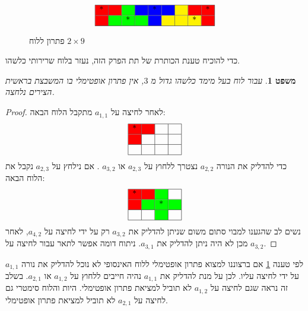 \documentclass[12pt,leqno]{article}
\theoremstyle{theoremdd}
\newtheorem{theorem}{משפט}[section]
\begin{document}
\begin{figure}[ht]
    \caption{פתרון ללוח 
    $2 \times 9$}
    \label{fig: 2x9 have min sol}
    \centering
    \[\begin{array}{|
        p{0.2cm}|p{0.2cm}|p{0.2cm}|
        p{0.2cm}|p{0.2cm}|p{0.2cm}|
        p{0.2cm}|p{0.2cm}|p{0.2cm}|}
        \hline
        \cellcolor{red}*&\cellcolor{red} &\cellcolor{green} &
        \cellcolor{blue}&\cellcolor{blue}* &\cellcolor{blue} &
        \cellcolor{yellow}&\cellcolor{red}&\cellcolor{red}* \\
        \hline
        \cellcolor{red}&\cellcolor{green} &\cellcolor{green}* &
        \cellcolor{green}&\cellcolor{blue} &\cellcolor{yellow} &
        \cellcolor{yellow}&\cellcolor{yellow}* &\cellcolor{red}\\
        \hline
    \end{array}\]
\end{figure}

כדי להוכיח טענת הכותרת של תת הפרק הזה, נעזר בלוח שרירותי כלשהו.
\begin{theorem}
    \label{thm:cant-press-a11}
    עבור לוח בעל מימד כלשהו גדול מ
    $3$,
    אין פתרון 
    אופטימלי בו המשבצת בראשית הצירים נלחצה.
\end{theorem}
\begin{proof}
    לאחר לחיצה על 
    $a_{1,1}$
    מתקבל הלוח הבאה:
    \[\begin{array}{|p{0.2cm}|p{0.2cm}|p{0.2cm}|p{0.2cm}|}
        \hline
        \cellcolor{red} *&\cellcolor{red} & & \\
        \hline
        \cellcolor{red}&  & &  \\
        \hline
         & & &  \\
        \hline
    \end{array}\]
    כדי להדליק 
    את הנורה
    $a_{2,2}$
    נצטרך 
    ללחוץ
    על
    $a_{2,3}$
    או 
    $a_{3,2}$
    .
    אם נילחץ על
   $a_{2,3}$
   נקבל את הלוח הבאה:
   \[\begin{array}{|p{0.2cm}|p{0.2cm}|p{0.2cm}|p{0.2cm}|}
    \hline
    \cellcolor{red} *&\cellcolor{red} &\cellcolor{green}& \\
    \hline
    \cellcolor{red}& \cellcolor{green}  & \cellcolor{green}*& \cellcolor{green}  \\
    \hline
     & &\cellcolor{green} &  \\
    \hline
    \end{array}\]
    נשים לב שהגענו למבוי סתום 
    משום שניתן להדליק את 
    $a_{3,2}$
    רק על ידי לחיצה על 
   $a_{4,2}$,
   לאחר מכן לא היה ניתן להדליק את 
   $a_{3,1}$.
   ניתוח דומה אפשר לתאר עבור 
   לחיצה על 
   $a_{3,2}$.
\end{proof}
לפי טענה
\ref{thm:cant-press-a11}
אם ברצוננו למצוא פתרון אופטימלי ללוח האינסופי לא נוכל 
להדליק את נורה 
$a_{1,1}$
על ידי לחיצה עליו.
לכן על מנת להדליק את 
$a_{1,1}$
נהיה חייבים ללחוץ על 
$a_{1,2}$
או 
$a_{2,1}$.
בשלב זה נראה שגם לחיצה על 
$a_{1,2}$
לא תוביל למציאת פתרון אופטימלי.
היות והלוח סימטרי גם
לחיצה על 
$a_{2,1}$
לא תוביל למציאת פתרון אופטימלי.
\end{document}
